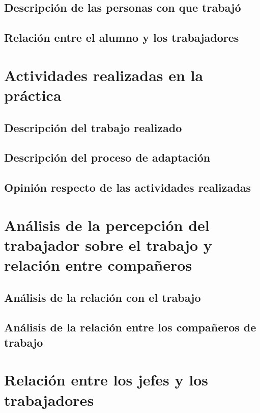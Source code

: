 \documentclass[12pt]{article}
\begin{document}
\subsection{Descripción de las personas con que trabajó}


\subsection{Relación entre el alumno y los trabajadores}



\section{Actividades realizadas en la práctica}

\subsection{Descripción del trabajo realizado}


\subsection{Descripción del proceso de adaptación}


\subsection{Opinión respecto de las actividades realizadas}





\section{Análisis de la percepción del trabajador sobre el trabajo y relación entre compañeros}
\subsection{Análisis de la relación con el trabajo}


\subsection{Análisis de la relación entre los compañeros de trabajo}



\section{Relación entre los jefes y los trabajadores}
\end{document}
